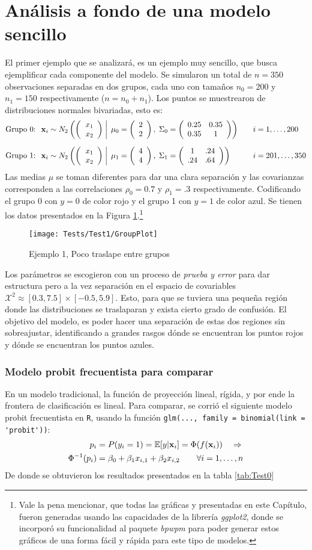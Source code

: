 \documentclass[../Main/Main.tex]{subfiles}
\begin{document}
\section{Análisis a fondo de una modelo sencillo} \label{sec:Test1}
El primer ejemplo que se analizará, es un ejemplo muy sencillo, que busca ejemplificar cada componente del modelo. Se simularon un total de $n = 350$ observaciones separadas en dos grupos, cada uno con tamaños $n_{0} = 200$ y  $n_{1} = 150$ respectivamente ($n = n_0 + n_1$). Los puntos se muestrearon de distribuciones normales bivariadas, esto es:
\begin{align*}
\text{Grupo 0: } \;
&\xsn_i \sim \normbivar{2}{2}{0.25}{0.35}{1}{0} \quad
& &i = 1,\ldots,200 \\[6pt]
\text{Grupo 1: } \;
&\xsn_i \sim \normbivar{4}{4}{1}{.24}{.64}{1} \quad
& &i = 201,\ldots,350
\end{align*}
Las medias $\mu$ se toman diferentes para dar una clara separación y las covarianzas corresponden a las correlaciones $\rho_0 = 0.7$ y $\rho_1 = .3$ respectivamente. Codificando el grupo 0 con $y = 0$ de color rojo y el grupo 1 con $y = 1$ de color azul. Se tienen los datos presentados en la Figura \ref{fig:Test1Plot}.\footnote{Vale la pena mencionar, que todas las gráficas y presentadas en este Capítulo, fueron generadas usando las capacidades de la librería \textit{ggplot2}, donde se incorporó su funcionalidad al paquete \textit{bpwpm} para poder generar estos gráficos de una forma fácil y rápida para este tipo de modelos.}
\begin{figure}[h]
  \centering
      \texttt{[image: Tests/Test1/GroupPlot]}
  \caption{Ejemplo 1, Poco traslape entre grupos}
 \label{fig:Test1Plot}
\end{figure}
Los parámetros se escogieron con un proceso de \textit{prueba y error} para dar estructura pero a la vez separación en el espacio de covariables $\mathcal{X}^2 \approx [0.3,7.5]\times[-0.5,5.9]$. Esto, para que se tuviera una pequeña región donde las distribuciones se traslaparan y exista cierto grado de confusión. El objetivo del modelo, es poder hacer una separación de estas dos regiones sin sobreajustar, identificando a grandes rasgos dónde se encuentran los puntos rojos y dónde se encuentran los puntos azules.

\subsubsection*{Modelo probit frecuentista para comparar}
En un modelo tradicional, la función de proyección lineal, rígida, y por ende la frontera de clasificación es lineal. Para comparar, se corrió el siguiente modelo probit frecuentista en \verb|R|, usando la función \verb|glm(..., family = binomial(link = 'probit'))|:
\begin{align}
	p_i & = P(y_i = 1) =\E[y|\xni] = \Phi(f(\xni))  \quad \Rightarrow  			\nonumber \\
	\Phi^{-1}(p_i) &= \beta_0 + \beta_1x_{i,1} + \beta_2x_{i,2} 
	\qquad 	\forall i =1,\ldots,n \label{ec:Test1ModGLM}
\end{align}
De donde se obtuvieron los resultados presentados en la tabla \ref{tab:Test0}
\end{document}
